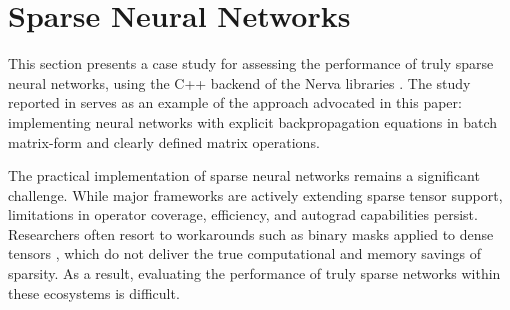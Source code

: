 \documentclass[twoside,11pt]{article}
\begin{document}
\section{Sparse Neural Networks} \label{section:sparse-neural-networks}
This section presents a case study for assessing the performance of truly sparse neural networks, using the C++ backend of the Nerva libraries \citep{Wesselink_Nerva_library}. The study reported in \citep{wesselink2024nervatrulysparseimplementation} serves as an example of the approach advocated in this paper: implementing neural networks with explicit backpropagation equations in batch matrix-form and clearly defined matrix operations.

The practical implementation of sparse neural networks remains a significant challenge. While major frameworks are actively extending sparse tensor support, limitations in operator coverage, efficiency, and autograd capabilities persist. Researchers often resort to workarounds such as binary masks applied to dense tensors \citep{liu2023lessonslearnednewsparseland}, which do not deliver the true computational and memory savings of sparsity. As a result, evaluating the performance of truly sparse networks within these ecosystems is difficult.
\end{document}
